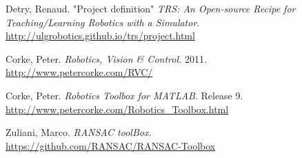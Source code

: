 \documentclass[12pt,a4paper]{article}
\begin{document}
\clearpage
\begin{thebibliography}{9}

Detry, Renaud. "Project definition" \textit{TRS: An Open-source Recipe for Teaching/Learning Robotics with a Simulator}. \\
\url{http://ulgrobotics.github.io/trs/project.html}

Corke, Peter. \textit{Robotics, Vision \& Control.} 2011.\\
\url{http://www.petercorke.com/RVC/}

Corke, Peter. \textit{Robotics Toolbox for MATLAB}. Release 9. \\
\url{http://www.petercorke.com/Robotics_Toolbox.html}

Zuliani, Marco. \textit{RANSAC toolBox.} \\
\url{https://github.com/RANSAC/RANSAC-Toolbox}


\end{thebibliography}
\end{document}
